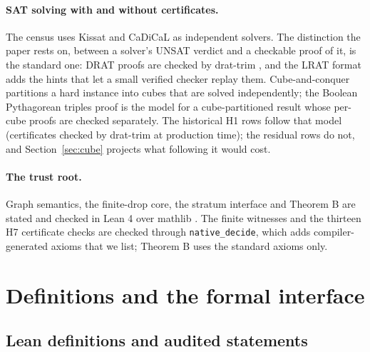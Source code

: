 \documentclass{anvil-paper}
\theoremstyle{definition}
\begin{document}
\paragraph{SAT solving with and without certificates.} The census uses Kissat \citep{biere2024kissat} and CaDiCaL \citep{biere2020cadical} as independent solvers. The distinction the paper rests on, between a solver's UNSAT verdict and a checkable proof of it, is the standard one: DRAT proofs are checked by drat-trim \citep{wetzler2014drat}, and the LRAT format \citep{cruzfilipe2017lrat} adds the hints that let a small verified checker replay them. Cube-and-conquer \citep{heule2011cube} partitions a hard instance into cubes that are solved independently; the Boolean Pythagorean triples proof \citep{heule2016pythagorean} is the model for a cube-partitioned result whose per-cube proofs are checked separately. The historical H1 rows follow that model (certificates checked by drat-trim at production time); the residual rows do not, and Section~\ref{sec:cube} projects what following it would cost.

\paragraph{The trust root.} Graph semantics, the finite-drop core, the stratum interface and Theorem B are stated and checked in Lean 4 \citep{moura2021lean4} over mathlib \citep{mathlib2020}. The finite witnesses and the thirteen H7 certificate checks are checked through \texttt{native\_decide}, which adds compiler-generated axioms that we list; Theorem B uses the standard axioms only.

\section{Definitions and the formal interface}\label{sec:prelim}

\subsection{Lean definitions and audited statements}\label{sec:lean-defs}
\end{document}
